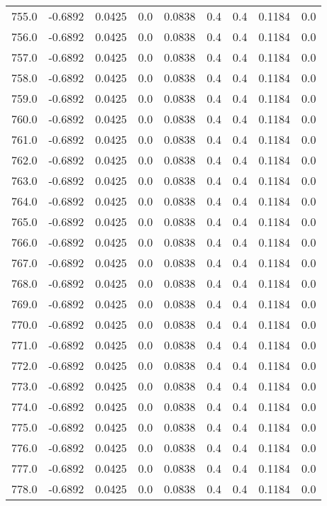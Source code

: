 \begin{longtable}{lrrrrrrrr}
755.0 & -0.6892 & 0.0425 & 0.0 & 0.0838 & 0.4 & 0.4 & 0.1184 & 0.0 \\
756.0 & -0.6892 & 0.0425 & 0.0 & 0.0838 & 0.4 & 0.4 & 0.1184 & 0.0 \\
757.0 & -0.6892 & 0.0425 & 0.0 & 0.0838 & 0.4 & 0.4 & 0.1184 & 0.0 \\
758.0 & -0.6892 & 0.0425 & 0.0 & 0.0838 & 0.4 & 0.4 & 0.1184 & 0.0 \\
759.0 & -0.6892 & 0.0425 & 0.0 & 0.0838 & 0.4 & 0.4 & 0.1184 & 0.0 \\
760.0 & -0.6892 & 0.0425 & 0.0 & 0.0838 & 0.4 & 0.4 & 0.1184 & 0.0 \\
761.0 & -0.6892 & 0.0425 & 0.0 & 0.0838 & 0.4 & 0.4 & 0.1184 & 0.0 \\
762.0 & -0.6892 & 0.0425 & 0.0 & 0.0838 & 0.4 & 0.4 & 0.1184 & 0.0 \\
763.0 & -0.6892 & 0.0425 & 0.0 & 0.0838 & 0.4 & 0.4 & 0.1184 & 0.0 \\
764.0 & -0.6892 & 0.0425 & 0.0 & 0.0838 & 0.4 & 0.4 & 0.1184 & 0.0 \\
765.0 & -0.6892 & 0.0425 & 0.0 & 0.0838 & 0.4 & 0.4 & 0.1184 & 0.0 \\
766.0 & -0.6892 & 0.0425 & 0.0 & 0.0838 & 0.4 & 0.4 & 0.1184 & 0.0 \\
767.0 & -0.6892 & 0.0425 & 0.0 & 0.0838 & 0.4 & 0.4 & 0.1184 & 0.0 \\
768.0 & -0.6892 & 0.0425 & 0.0 & 0.0838 & 0.4 & 0.4 & 0.1184 & 0.0 \\
769.0 & -0.6892 & 0.0425 & 0.0 & 0.0838 & 0.4 & 0.4 & 0.1184 & 0.0 \\
770.0 & -0.6892 & 0.0425 & 0.0 & 0.0838 & 0.4 & 0.4 & 0.1184 & 0.0 \\
771.0 & -0.6892 & 0.0425 & 0.0 & 0.0838 & 0.4 & 0.4 & 0.1184 & 0.0 \\
772.0 & -0.6892 & 0.0425 & 0.0 & 0.0838 & 0.4 & 0.4 & 0.1184 & 0.0 \\
773.0 & -0.6892 & 0.0425 & 0.0 & 0.0838 & 0.4 & 0.4 & 0.1184 & 0.0 \\
774.0 & -0.6892 & 0.0425 & 0.0 & 0.0838 & 0.4 & 0.4 & 0.1184 & 0.0 \\
775.0 & -0.6892 & 0.0425 & 0.0 & 0.0838 & 0.4 & 0.4 & 0.1184 & 0.0 \\
776.0 & -0.6892 & 0.0425 & 0.0 & 0.0838 & 0.4 & 0.4 & 0.1184 & 0.0 \\
777.0 & -0.6892 & 0.0425 & 0.0 & 0.0838 & 0.4 & 0.4 & 0.1184 & 0.0 \\
778.0 & -0.6892 & 0.0425 & 0.0 & 0.0838 & 0.4 & 0.4 & 0.1184 & 0.0 \\

\end{longtable}
